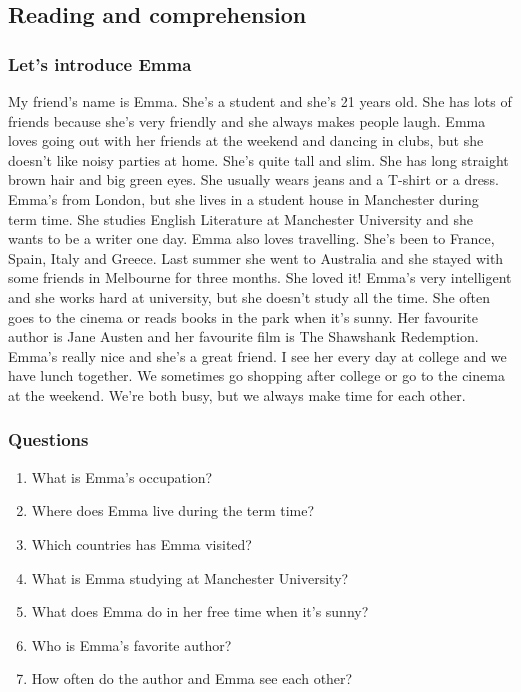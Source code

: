 \documentclass[]{article} %
\begin{document}
	\subsection{Reading and comprehension}
	
	\subsubsection*{Let's introduce Emma}
	
My friend's name is Emma. She's a student and she's 21 years old. She has lots of friends because she's very friendly and she always makes people laugh. Emma loves going out with her friends at the weekend and dancing in clubs, but she doesn't like noisy parties at home. She's quite tall and slim. She has long straight brown hair and big green eyes. She usually wears jeans and a T-shirt or a dress. Emma's from London, but she lives in a student house in Manchester during term time. She studies English Literature at Manchester University and she wants to be a writer one day. Emma also loves travelling. She's been to France, Spain, Italy and Greece. Last summer she went to Australia and she stayed with some friends in Melbourne for three months. She loved it! Emma's very intelligent and she works hard at university, but she doesn't study all the time. She often goes to the cinema or reads books in the park when it's sunny. Her favourite author is Jane Austen and her favourite film is The Shawshank Redemption. Emma's really nice and she's a great friend. I see her every day at college and we have lunch together. We sometimes go shopping after college or go to the cinema at the weekend. We're both busy, but we always make time for each other.
	
	
	\subsubsection*{Questions}
	
	\begin{enumerate}
\item What is Emma's occupation?\\
\item Where does Emma live during the term time?\\
\item Which countries has Emma visited?\\
\item What is Emma studying at Manchester University?\\
\item What does Emma do in her free time when it's sunny?\\
\item Who is Emma's favorite author?\\
\item How often do the author and Emma see each other?\\
	\end{enumerate}
	
\end{document}
